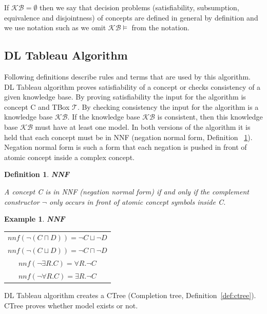 \documentclass[12pt,a4paper]{article}
\newtheorem{definition}{Definition}[subsection]
\newtheorem{example}{Example}[subsection]
\begin{document}
If $\mathcal{KB} = \emptyset$ then we say that decision problems (satisfiability, subsumption, equivalence and disjointness) of concepts are defined in general by definition and we use notation such as we omit $\mathcal{KB} \models$ from the notation.

\subsection{DL Tableau Algorithm}
Following definitions \citep{baaderHandbook} describe rules and terms that are used by this algorithm. DL Tableau algorithm proves satisfiability of a concept or checks consistency of a given knowledge base. By proving satisfiability the input for the algorithm is concept C and TBox $\mathcal{T}$. By checking consistency the input for the algorithm is a knowledge base $\mathcal{KB}$. If the knowledge base $\mathcal{KB}$ is consistent, then this knowledge base $\mathcal{KB}$ must have at least one model. In both versions of the algorithm it is held that each concept must be in NNF (negation normal form, Definition ~\ref{def:nnf}). Negation normal form is such a form that each negation is pushed in front of atomic concept inside a complex concept. 

\begin{definition}{\textbf{NNF}}
	\label{def:nnf}
	
	A concept C is in NNF (negation normal form) if and only if the complement constructor $\neg$ only occurs in front of atomic concept symbols inside C.
\end{definition}

\begin{example}{\textbf{NNF}}
	\begin{table}[H]
		\centering
		\begin{tabular}{c}
			$ nnf(\neg (C \sqcap D)) = \neg C \sqcup \neg D $ \\
			\addlinespace[0.4cm]
			$ nnf(\neg (C \sqcup D)) = \neg C \sqcap \neg D $ \\
			\addlinespace[0.4cm]
			$ nnf(\neg \exists R.C) = \forall R. \neg C $ \\
			\addlinespace[0.4cm]
			$ nnf(\neg \forall R.C) = \exists R. \neg C $
		\end{tabular}
	\end{table}
	
\end{example}

DL Tableau algorithm creates a CTree (Completion tree, Definition~\ref{def:ctree}). CTree proves whether model exists or not.
\end{document}
